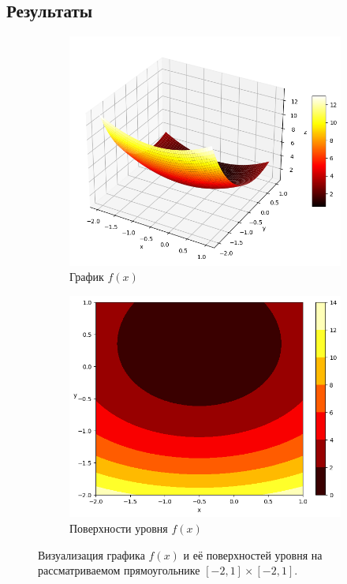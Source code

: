 \documentclass[12pt]{article}%
\begin{document}
\subsection{Результаты}
\begin{figure}[!h]
\centering
\begin{subfigure}{0.45\textwidth}
    \includegraphics[width=\textwidth]{task3_surface.png}
    \caption{График $f(x)$}
\end{subfigure}
\hfill
\begin{subfigure}{0.45\textwidth}
    \includegraphics[width=\textwidth]{task3_contour.png}
    \caption{Поверхности уровня $f(x)$}
\end{subfigure}

\caption{Визуализация графика $f(x)$ и её поверхностей уровня на рассматриваемом прямоугольнике $[-2, 1] \times [-2, 1]. $}
\end{figure}
\end{document}
